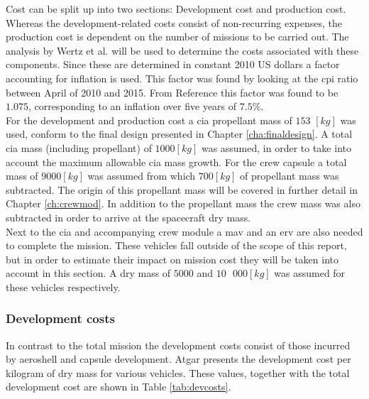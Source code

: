Cost can be split up into two sections: Development cost and production cost. Whereas the development-related costs consist of non-recurring expenses, the production cost is dependent on the number of missions to be carried out. The analysis by Wertz et al. \cite{Wertz2011} will be used to determine the costs associated with these components. Since these are determined in constant 2010 US dollars a factor accounting for inflation is used. This factor was found by looking at the \gls{cpi} ratio between April of 2010 and 2015. From Reference \cite{Crawford2015} this factor was found to be $1.075$, corresponding to an inflation over five years of $7.5\%$.\\
For the development and production cost a \gls{cia} propellant mass of $153$ $\left[kg\right]$ was used, conform to the final design presented in Chapter \ref{cha:finaldesign}. A total \gls{cia} mass (including propellant) of $1000 \left[kg\right]$ was assumed, in order to take into account the maximum allowable \gls{cia} mass growth. For the crew capsule a total mass of $9000 \left[kg\right]$ was assumed from which $700 \left[kg\right]$ of propellant mass was subtracted. The origin of this propellant mass will be covered in further detail in Chapter \ref{ch:crewmod}. In addition to the propellant mass the crew mass was also subtracted in order to arrive at the spacecraft dry mass.\\
Next to the \gls{cia} and accompanying crew module a \gls{mav} and an \gls{erv} are also needed to complete the mission. These vehicles fall outside of the scope of this report, but in order to estimate their impact on mission cost they will be taken into account in this section. A dry mass of $5000$ and $10\mbox{ }000 \left[kg\right]$ was assumed for these vehicles respectively.

\subsubsection{Development costs}
In contrast to the total mission the development costs consist of those incurred by aeroshell and capsule development. Atgar \cite[p.296]{Wertz2011} presents the development cost per kilogram of dry mass for various vehicles. These values, together with the total development cost are shown in Table \ref{tab:devcosts}.

